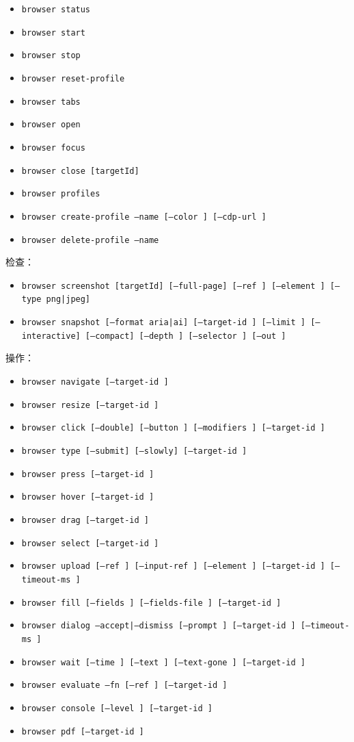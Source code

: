 \begin{itemize}
  \item \texttt{browser status}
  \item \texttt{browser start}
  \item \texttt{browser stop}
  \item \texttt{browser reset-profile}
  \item \texttt{browser tabs}
  \item \texttt{browser open }
  \item \texttt{browser focus }
  \item \texttt{browser close [targetId]}
  \item \texttt{browser profiles}
  \item \texttt{browser create-profile --name  [--color ] [--cdp-url ]}
  \item \texttt{browser delete-profile --name }
\end{itemize}


检查：

\begin{itemize}
  \item \texttt{browser screenshot [targetId] [--full-page] [--ref ] [--element ] [--type png|jpeg]}
  \item \texttt{browser snapshot [--format aria|ai] [--target-id ] [--limit ] [--interactive] [--compact] [--depth ] [--selector ] [--out ]}
\end{itemize}


操作：

\begin{itemize}
  \item \texttt{browser navigate  [--target-id ]}
  \item \texttt{browser resize   [--target-id ]}
  \item \texttt{browser click  [--double] [--button ] [--modifiers ] [--target-id ]}
  \item \texttt{browser type   [--submit] [--slowly] [--target-id ]}
  \item \texttt{browser press  [--target-id ]}
  \item \texttt{browser hover  [--target-id ]}
  \item \texttt{browser drag   [--target-id ]}
  \item \texttt{browser select   [--target-id ]}
  \item \texttt{browser upload  [--ref ] [--input-ref ] [--element ] [--target-id ] [--timeout-ms ]}
  \item \texttt{browser fill [--fields ] [--fields-file ] [--target-id ]}
  \item \texttt{browser dialog --accept|--dismiss [--prompt ] [--target-id ] [--timeout-ms ]}
  \item \texttt{browser wait [--time ] [--text ] [--text-gone ] [--target-id ]}
  \item \texttt{browser evaluate --fn  [--ref ] [--target-id ]}
  \item \texttt{browser console [--level ] [--target-id ]}
  \item \texttt{browser pdf [--target-id ]}
\end{itemize}


